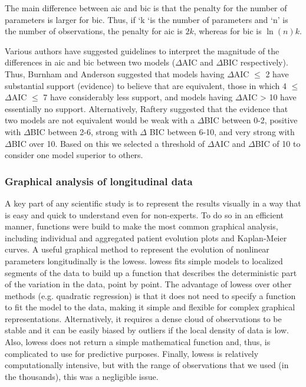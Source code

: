 The main difference between \gls{aic} and \gls{bic} is that the penalty for the number of parameters is larger for \gls{bic}. Thus, if ‘k ‘is the number of parameters and ‘n’ is the number of observations, the penalty for \gls{aic} is $2k$, whereas for \gls{bic} is $\ln(n)k$.

Various authors have suggested guidelines to interpret the magnitude of the differences in \gls{aic} and \gls{bic} between two models ($\Delta$AIC and $\Delta$BIC respectively). Thus, Burnham and Anderson\cite{Burnham2004} suggested that models having $\Delta$AIC $\leq$ 2 have substantial support (evidence) to believe that are equivalent, those in which 4 $\leq$ $\Delta$AIC $\leq$ 7 have considerably less support, and models having $\Delta$AIC > 10 have essentially no support. Alternatively, Raftery\cite{Raftery1995} suggested that the evidence that two models are not equivalent would be weak with a $\Delta$BIC between 0-2, positive with $\Delta$BIC between 2-6, strong with $\Delta$ BIC between 6-10, and very strong with $\Delta$BIC over 10. Based on this we selected a threshold of $\Delta$AIC and $\Delta$BIC of 10 to consider one model superior to others.

\subsubsection{Graphical analysis of longitudinal data}
A key part of any scientific study is to represent the results visually in a way that is easy and quick to understand even for non-experts. To do so in an efficient manner, functions were build to make the most common graphical analysis, including individual and aggregated patient evolution plots and Kaplan-Meier curves. A useful graphical method to represent the evolution of nonlinear parameters longitudinally is the \gls{lowess}. \gls{lowess} fits simple models to localized segments of the data to build up a function that describes the deterministic part of the variation in the data, point by point.
The advantage of \gls{lowess} over other methods (e.g. quadratic regression) is that it does not need to specify a function to fit the model to the data, making it simple and flexible for complex graphical representations. Alternatively, it requires a dense cloud of observations to be stable and it can be easily biased by outliers if the local density of data is low. Also, \gls{lowess} does not return a simple mathematical function and, thus, is complicated to use for predictive purposes. Finally, \gls{lowess} is relatively computationally intensive, but with the range of observations that we used (in the thousands), this was a negligible issue.

